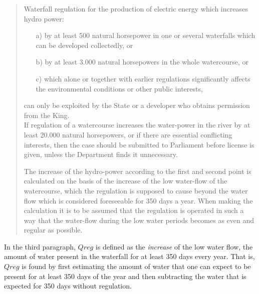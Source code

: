 \begin{quote}
Waterfall regulation for the production of electric energy which increases hydro power:
\begin{itemize}
\item[a)]            by at least 500 natural horsepower in one or several waterfalls which can be developed 
                 collectedly, or

\item [b)]             by at least 3.000 natural horsepowers in the whole watercourse, or

\item [c)]              which alone or together with earlier regulations significantly affects the environmental
                 conditions or other public interests, 
\end{itemize}
can only be exploited by the State or a developer who obtains permission from the King. \\ 
If regulation of a watercourse increases the water-power in the river by at least 20.000 natural horsepowers, or if there are essential conflicting interests, then the case should be submitted to Parliament before license is given, unless the Department finds it unnecessary.

The increase of the hydro-power according to the first and second point is calculated on the basis of the increase of the low water-flow of the watercourse, which the regulation is supposed to cause beyond the water flow which is considered foreseeable for 350 days a year. When making the calculation it is to be assumed that the regulation is operated in such a way that the water-flow during the low water periods becomes as even and regular as possible.  
\end{quote}

In the third paragraph, $Qreg$ is defined as the {\it increase} of the low water flow, the amount of water present in the waterfall for at least 350 days every year. That is, $Qreg$ is found by first estimating the amount of water that one can expect to be present for at least 350 days of the year and then subtracting the water that is expected for 350 days without regulation.

